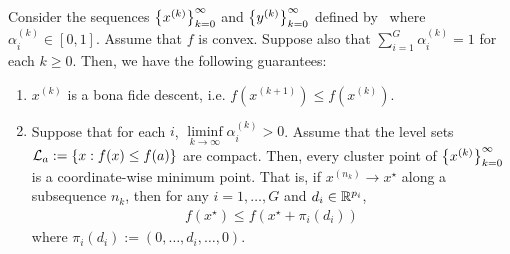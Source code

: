 \begin{theorem}\label{thm:parallel-bcd}
Consider the sequences $\left\{x^{(k)}\right\}_{k=0}^\infty$ and $\left\{y^{(k)}\right\}_{k=0}^\infty$
defined by~
where $\alpha_i^{(k)} \in [0,1]$.
Assume that $f$ is convex.
Suppose also that $\sum\limits_{i=1}^G \alpha_i^{(k)} = 1$
for each $k \geq 0$.
Then, we have the following guarantees:
\begin{enumerate}[label=(\roman*)]
\item\label{thm:parallel-bcd:descent}
    $x^{(k)}$ is a bona fide descent, i.e. $f(x^{(k+1)}) \leq f(x^{(k)})$.
    
\item\label{thm:parallel-bcd:convg}
    Suppose that for each $i$,
    $\liminf\limits_{k\to\infty} \alpha_i^{(k)} > 0$.
    Assume that the level sets $\mathcal{L}_a := \left\{x : f(x) \leq f(a)\right\}$ are compact.
    Then, every cluster point of $\left\{x^{(k)}\right\}_{k=0}^\infty$ is a coordinate-wise minimum point.
    That is, if $x^{(n_k)} \to x^\star$ along a subsequence $n_k$, 
    then for any $i =1,\ldots, G$ and $d_i \in \mathbb{R}^{p_i}$,
    \begin{align*}
        f(x^\star) \leq f(x^\star + \pi_i(d_i))
    \end{align*}
    where $\pi_i(d_i) := (0,\ldots, d_i, \ldots, 0)$.
\end{enumerate}
\end{theorem}
